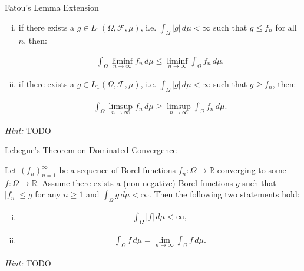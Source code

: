 \documentclass[10pt,landscape]{article}
\renewcommand{\leq}{\leqslant}
\renewcommand{\geq}{\geqslant}
\newcommand{\Hint}{\textit{Hint: }}
\newcommand{\CalF}{\mathcal{F}}
\begin{document}
\begin{multicols}{3}
\begin{corollary}{3.11}{Fatou's Lemma Extension}
        \begin{enumerate}[(i)]
            \item if there exists a $g \in L_1(\Omega, \CalF, \mu)$, i.e. $\int_{\Omega} |g| \, d\mu < \infty$ such that $g \leq f_n$ for all $n$, then:

            \begin{align*}
                \int_{\Omega} \liminf_{n \to \infty} f_n \, d\mu \leq \liminf_{n \to \infty} \int_{\Omega} f_n \, d\mu.
            \end{align*}
            \item if there exists a $g \in L_1(\Omega, \CalF, \mu)$, i.e. $\int_{\Omega} |g| \, d\mu < \infty$ such that $g \geq f_n$, then:

            \begin{align*}
                \int_{\Omega} \limsup_{n \to \infty} f_n \, d\mu \geq \limsup_{n \to \infty} \int_{\Omega} f_n \, d\mu.
            \end{align*}
        \end{enumerate}

    \Hint TODO

\end{corollary}

\begin{theorem}{3.12}{Lebegue's Theorem on Dominated Convergence}

    Let $(f_n)_{n=1}^{\infty}$ be a sequence of Borel functions $f_n: \Omega \to \overline{\mathbb{R}}$ converging to some $f: \Omega \to \overline{\mathbb{R}}$. Assume there exists a (non-negative) Borel functions $g$ such that $|f_n| \leq g$ for any $n \geq 1$ and $\int_{\Omega} g \, d\mu < \infty$. Then the following two statements hold:

        \begin{enumerate}[(i)]
            \item
                \begin{align*}
                    \int_{\Omega} |f| \, d\mu < \infty,
                \end{align*}
            \item
                \begin{align*}
                    \int_{\Omega} f \, d\mu = \lim_{n \to \infty} \int_{\Omega} f \, d\mu.
                \end{align*}
        \end{enumerate}

    \Hint TODO

\end{theorem}


\end{multicols}
\end{document}
